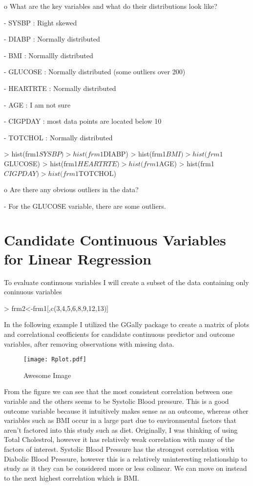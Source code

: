 \documentclass{article}
\begin{document}
o  What are the key variables and what do their distributions look like?

- SYSBP : Right skewed

- DIABP : Normally distributed

- BMI : Normallly distributed

- GLUCOSE : Normally distributed (some outliers over 200)

- HEARTRTE : Normally distributed

- AGE : I am not sure

- CIGPDAY : most data points are located below 10

- TOTCHOL : Normally distributed
\begin{Schunk}
\begin{Sinput}
> hist(frm1$SYSBP)
> hist(frm1$DIABP)
> hist(frm1$BMI)
> hist(frm1$GLUCOSE)
> hist(frm1$HEARTRTE)
> hist(frm1$AGE)
> hist(frm1$CIGPDAY)
> hist(frm1$TOTCHOL)
\end{Sinput}
\end{Schunk}

o  Are there any obvious outliers in the data?

- For the GLUCOSE variable, there are some outliers. 


\section{Candidate Continuous Variables for Linear Regression}

To evaluate continuous variables I will create a subset of the data containing only coninuous variables
\begin{Schunk}
\begin{Sinput}
> frm2<-frm1[,c(3,4,5,6,8,9,12,13)]
\end{Sinput}
\end{Schunk}

In the following example I utilized the GGally package to create a matrix of plots and correlational ceofficients for candidate continuous predictor and outcome variables, after removing observations with missing data.
\begin{figure}[h]
\begin{center}
    \centering
    \texttt{[image: Rplot.pdf]}
    \caption{Awesome Image}
    \label{fig:awesome_image}
\end{center}
\end{figure}
\newpage

From the figure we can see that the most consistent correlation between one variable and the others seems to be Systolic Blood pressure.  This is a good outcome variable because it intuitively makes sense as an outcome, whereas other variables such as BMI occur in a large part due to environmental factors that aren't factored into this study such as diet. Originally, I was thinking of using Total Cholestrol, however it has relatively weak correlation with many of the factors of interest. Systolic Blood Pressure has the strongest correlation with Diabolic Blood Pressure, however this is a relatively uninteresting relationship to study as it they can be considered more or less colinear. We can move on instead to the next highest correlation which is BMI.
\end{document}
